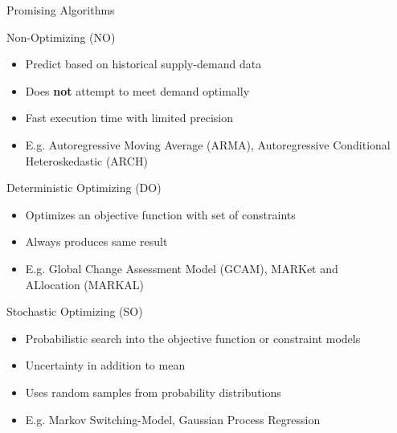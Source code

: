 \documentclass[final]{beamer}
\newlength{\sepwid}
\newlength{\onecolwid}
\newlength{\threecolwid}
\begin{document}
\begin{frame}[t]
\begin{columns}[t,totalwidth=\threecolwid]
\begin{column}{\sepwid}\end{column} %



\begin{column}{\onecolwid} %



\begin{block}{Promising Algorithms}\end{block}

        \begin{alertblock}{Non-Optimizing (NO)}
	\begin{itemize}
		\item {\large Predict based on historical supply-demand data}
		\item{\large  Does \textbf{not} attempt to meet demand optimally}
		\item {\large Fast execution time with limited precision}
		\item {\large E.g. Autoregressive Moving Average (ARMA), Autoregressive Conditional Heteroskedastic (ARCH)}
	\end{itemize}
        \end{alertblock}
        
        \begin{alertblock}{Deterministic Optimizing (DO)}
	\begin{itemize}
		\item{\large  Optimizes an objective function with set of constraints}
		\item {\large Always produces same result}
		\item{\large  E.g. Global Change Assessment Model (GCAM), MARKet and ALlocation (MARKAL)}
	\end{itemize}
        \end{alertblock}

        \begin{alertblock}{Stochastic Optimizing (SO)}
	\begin{itemize}
		\item {\large Probabilistic search into the objective function or constraint models}
		\item {\large Uncertainty in addition to mean}
		\item {\large Uses random samples from probability distributions}
		\item {\large E.g. Markov Switching-Model, Gaussian Process Regression}
	\end{itemize}
        \end{alertblock}


\end{column}
\end{columns}
\end{frame}
\end{document}
